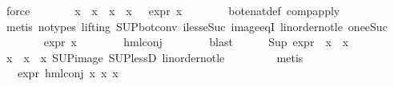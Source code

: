 \begin{isabellebody}
\ force\isanewline
\ \ \ \ \isamarkupfalse%
\ \isamarkupfalse%
\ x\ \ {\isachardoublequoteopen}x\ {\isasymin}\ {\isacharparenleft}{\kern0pt}x{}\ {\isacharbackquote}{\kern0pt}\ x{}{\isacharparenright}{\kern0pt}{\isachardoublequoteclose}\ {\isachardoublequoteopen}{}\ {\isasymle}\ expr{\isacharunderscore}{\kern0pt}{}\ x{\isachardoublequoteclose}\isanewline
\ \ \ \ \ \ \isamarkupfalse%
\ bot{\isacharunderscore}{\kern0pt}enat{\isacharunderscore}{\kern0pt}def\ comp{\isacharunderscore}{\kern0pt}apply\isanewline
\ \ \ \ \ \ \isamarkupfalse%
\ {\isacharparenleft}{\kern0pt}metis\ {\isacharparenleft}{\kern0pt}no{\isacharunderscore}{\kern0pt}types{\isacharcomma}{\kern0pt}\ lifting{\isacharparenright}{\kern0pt}\ SUP{\isacharunderscore}{\kern0pt}bot{\isacharunderscore}{\kern0pt}conv{\isacharparenleft}{\kern0pt}{}{\isacharparenright}{\kern0pt}\ iless{\isacharunderscore}{\kern0pt}eSuc{}\ image{\isacharunderscore}{\kern0pt}eqI\ linorder{\isacharunderscore}{\kern0pt}not{\isacharunderscore}{\kern0pt}le\ one{\isacharunderscore}{\kern0pt}eSuc{\isacharparenright}{\kern0pt}\isanewline
\ \ \ \ \isamarkupfalse%
\ {\isachardoublequoteopen}{}\ {\isasymle}\ expr{\isacharunderscore}{\kern0pt}{}\ x{\isachardoublequoteclose}\isanewline
\ \ \ \ \ \ \isamarkupfalse%
\ hml{\isacharunderscore}{\kern0pt}conj\isanewline
\ \ \ \ \ \ \isamarkupfalse%
\ blast\isanewline
\ \ \ \ \isamarkupfalse%
\ {\isachardoublequoteopen}Sup\ {\isacharparenleft}{\kern0pt}{\isacharparenleft}{\kern0pt}expr{\isacharunderscore}{\kern0pt}{}\ {\isasymcirc}\ x{}{\isacharparenright}{\kern0pt}\ {\isacharbackquote}{\kern0pt}\ x{}{\isacharparenright}{\kern0pt}\ {\isasymge}\ {}{\isachardoublequoteclose}\isanewline
\ \ \ \ \ \ \isamarkupfalse%
\ {\isacartoucheopen}x\ {\isasymin}\ {\isacharparenleft}{\kern0pt}x{}\ {\isacharbackquote}{\kern0pt}\ x{}{\isacharparenright}{\kern0pt}{\isacartoucheclose}\ SUP{\isacharunderscore}{\kern0pt}image\ SUP{\isacharunderscore}{\kern0pt}lessD\ linorder{\isacharunderscore}{\kern0pt}not{\isacharunderscore}{\kern0pt}le\ \isanewline
\ \ \ \ \ \ \isamarkupfalse%
\ metis\isanewline
\ \ \ \ \isamarkupfalse%
\ \isamarkupfalse%
\ {\isachardoublequoteopen}{}\ {\isasymle}\ expr{\isacharunderscore}{\kern0pt}{}\ {\isacharparenleft}{\kern0pt}hml{\isacharunderscore}{\kern0pt}conj\ x{}\ x{}\ x{}{\isacharparenright}{\kern0pt}{\isachardoublequoteclose}\ \isanewline

\end{isabellebody}
